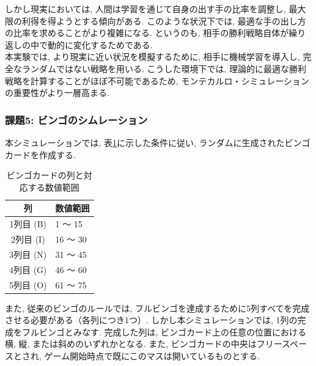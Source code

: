\documentclass[a4j, 12pt ]{jarticle}
\begin{document}
しかし現実においては, 人間は学習を通じて自身の出す手の比率を調整し, 最大限の利得を得ようとする傾向がある. このような状況下では, 最適な手の出し方の比率を求めることがより複雑になる. というのも, 相手の勝利戦略自体が繰り返しの中で動的に変化するためである.\\

本実験では, より現実に近い状況を模擬するために, 相手に機械学習を導入し, 完全なランダムではない戦略を用いる. こうした環境下では, 理論的に最適な勝利戦略を計算することがほぼ不可能であるため, モンテカルロ・シミュレーションの重要性がより一層高まる.\\

\subsubsection{課題5: ビンゴのシムレーション}
本シミュレーションでは, 表\ref{tab:bingo_column_rules}に示した条件に従い, ランダムに生成されたビンゴカードを作成する.
\begin{table}[H]
  \centering
  \caption{ビンゴカードの列と対応する数値範囲}\label{tab:bingo_column_rules}
  \begin{tabular}{cl}
    \toprule
    列 & 数値範囲 \\
    \midrule
    1列目 (B) & 1 ～ 15 \\
    2列目 (I) & 16 ～ 30 \\
    3列目 (N) & 31 ～ 45 \\
    4列目 (G) & 46 ～ 60 \\
    5列目 (O) & 61 ～ 75 \\
    \bottomrule
  \end{tabular}
\end{table}
また, 従来のビンゴのルールでは, フルビンゴを達成するために5列すべてを完成させる必要がある（各列につき1つ）. しかし本シミュレーションでは, 1列の完成をフルビンゴとみなす. 完成した列は, ビンゴカード上の任意の位置における横, 縦, または斜めのいずれかとなる. また, ビンゴカードの中央はフリースペースとされ, ゲーム開始時点で既にこのマスは開いているものとする.\\
\end{document}
